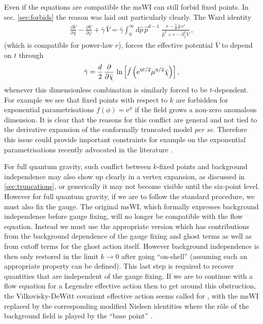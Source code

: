 \documentclass[11pt,draft]{book} %
\newcommand{\bc}{\bar \chi}
\newcommand{\bV}{\bar V}
\begin{document}
Even if the equations are compatible the msWI can still forbid fixed points.
In sec. \ref{sec:forbids} the reason was laid out particularly clearly. The Ward identity
\begin{align}
  \frac{\partial \bar V}{\partial \bar\chi} - \frac{\partial \bar V}{\partial \bar\varphi} + \bar \gamma \, \bar V = \bar \gamma
  \int_0^{\infty} \mathrm d\hat p \, \hat p^{d-1} \; \frac{r - \frac{1}{d} \, \hat p \, r'}{\hat p^2 + r - \partial^2_{\bar\varphi}\bar V} \,,
\end{align}
(which is compatible for power-law $r$),
forces the effective potential $\bV$ to depend on $t$ through
\begin{align}
  \bar{\gamma} = \frac{d}{2} \, \frac{\partial}{\partial\bc} \,
  \ln \left[ \bar{f} \left({\rm e}^{\eta t/2}\mu^{\eta/2}\bc \right) \right] ,
\end{align}
whenever this dimensionless combination is similarly forced to be $t$-dependent.
For example we see that fixed points with respect to $k$ are forbidden for exponential parametrisations
$f(\phi) = \mathrm e ^ \phi$  if the field grows a non-zero anomalous dimension.
It is clear that the reasons for this conflict are general and not tied to the derivative expansion
of the conformally truncated model \textit{per se}.
Therefore this issue could provide important constraints for example on the exponential parametrisations
recently advocated in the literature
\cite{Demmel:2015zfa,Eichhorn:2013xr,Eichhorn:2015bna,Nink:2014yya,Percacci:2015wwa,
Labus:2015ska,Ohta:2015efa,Gies:2015tca}.

For full quantum gravity, such conflict between $k$-fixed points and background independence may also
show up clearly in a vertex expansion, as discussed in \ref{sec:truncations},
or generically it may not become visible until the six-point level.
However for full quantum gravity, if we are to follow the standard procedure, we must also fix the gauge.
The original msWI, which formally expresses background independence before gauge fixing,
will no longer be compatible with the flow equation.
Instead we must use the appropriate version which has contributions from the background dependence of
the gauge fixing and ghost terms as well as from cutoff terms for the ghost action itself.
However background independence is then only restored in the limit $k\to0$ after going ``on-shell''
(assuming such an appropriate property can be defined).
This last step is required to recover quantities that are independent of the gauge fixing.
If we are to continue with a flow equation for a Legendre effective action
\cite{Wetterich:1992yh,Morris:1993qb} then to get around this obstruction,
the Vilkovisky-DeWitt covariant effective action seems called for
\cite{Branchina:2003ek,Donkin:2012ud,Demmel:2014hla,Safari:2015dva},
with the msWI replaced by the corresponding modified Nielsen identities where the r\^ole of the background
field is played by the ``base point'' \cite{Pawlowski:2003sk}.
\end{document}
